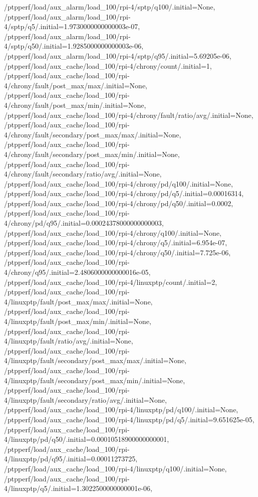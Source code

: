 {    /ptpperf/load/aux_alarm/load_100/rpi-4/sptp/q100/.initial=None,
    /ptpperf/load/aux_alarm/load_100/rpi-4/sptp/q5/.initial=1.9730000000000003e-07,
    /ptpperf/load/aux_alarm/load_100/rpi-4/sptp/q50/.initial=1.9285000000000003e-06,
    /ptpperf/load/aux_alarm/load_100/rpi-4/sptp/q95/.initial=5.69205e-06,
    /ptpperf/load/aux_cache/load_100/rpi-4/chrony/count/.initial=1,
    /ptpperf/load/aux_cache/load_100/rpi-4/chrony/fault/post_max/max/.initial=None,
    /ptpperf/load/aux_cache/load_100/rpi-4/chrony/fault/post_max/min/.initial=None,
    /ptpperf/load/aux_cache/load_100/rpi-4/chrony/fault/ratio/avg/.initial=None,
    /ptpperf/load/aux_cache/load_100/rpi-4/chrony/fault/secondary/post_max/max/.initial=None,
    /ptpperf/load/aux_cache/load_100/rpi-4/chrony/fault/secondary/post_max/min/.initial=None,
    /ptpperf/load/aux_cache/load_100/rpi-4/chrony/fault/secondary/ratio/avg/.initial=None,
    /ptpperf/load/aux_cache/load_100/rpi-4/chrony/pd/q100/.initial=None,
    /ptpperf/load/aux_cache/load_100/rpi-4/chrony/pd/q5/.initial=0.00016314,
    /ptpperf/load/aux_cache/load_100/rpi-4/chrony/pd/q50/.initial=0.0002,
    /ptpperf/load/aux_cache/load_100/rpi-4/chrony/pd/q95/.initial=0.00024378000000000003,
    /ptpperf/load/aux_cache/load_100/rpi-4/chrony/q100/.initial=None,
    /ptpperf/load/aux_cache/load_100/rpi-4/chrony/q5/.initial=6.954e-07,
    /ptpperf/load/aux_cache/load_100/rpi-4/chrony/q50/.initial=7.725e-06,
    /ptpperf/load/aux_cache/load_100/rpi-4/chrony/q95/.initial=2.4806000000000016e-05,
    /ptpperf/load/aux_cache/load_100/rpi-4/linuxptp/count/.initial=2,
    /ptpperf/load/aux_cache/load_100/rpi-4/linuxptp/fault/post_max/max/.initial=None,
    /ptpperf/load/aux_cache/load_100/rpi-4/linuxptp/fault/post_max/min/.initial=None,
    /ptpperf/load/aux_cache/load_100/rpi-4/linuxptp/fault/ratio/avg/.initial=None,
    /ptpperf/load/aux_cache/load_100/rpi-4/linuxptp/fault/secondary/post_max/max/.initial=None,
    /ptpperf/load/aux_cache/load_100/rpi-4/linuxptp/fault/secondary/post_max/min/.initial=None,
    /ptpperf/load/aux_cache/load_100/rpi-4/linuxptp/fault/secondary/ratio/avg/.initial=None,
    /ptpperf/load/aux_cache/load_100/rpi-4/linuxptp/pd/q100/.initial=None,
    /ptpperf/load/aux_cache/load_100/rpi-4/linuxptp/pd/q5/.initial=9.651625e-05,
    /ptpperf/load/aux_cache/load_100/rpi-4/linuxptp/pd/q50/.initial=0.00010518900000000001,
    /ptpperf/load/aux_cache/load_100/rpi-4/linuxptp/pd/q95/.initial=0.00011273725,
    /ptpperf/load/aux_cache/load_100/rpi-4/linuxptp/q100/.initial=None,
    /ptpperf/load/aux_cache/load_100/rpi-4/linuxptp/q5/.initial=1.3022500000000001e-06,
}
